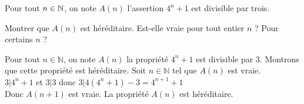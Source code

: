 \begin{exo}
Pour tout $n \in \mathbb N$, on note $A(n)$ l'assertion \og $4^n+1$ est divisible par trois.\fg

Montrer que $A(n)$ est héréditaire. Est-elle vraie pour tout entier $n$ ? Pour certains $n$ ?

\begin{sol}
Pour tout $n \in \mathbb{N}$, on note $A(n)$ la propriété \og$4^n+1$ est divisible par 3\fg. Montrons que cette propriété est héréditaire.
Soit $n \in \mathbb{N}$ tel que $A(n)$ est vraie. \\
$3|4^n+1$ et $3|3$ donc $3|4(4^n+1)-3 = 4^{n+1}+1$\\
Donc $A(n+1)$ est vraie. La propriété $A(n)$ est héréditaire.
\end{sol}
\end{exo}



